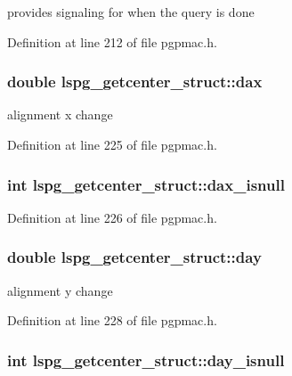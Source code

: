 provides signaling for when the query is done 



Definition at line 212 of file pgpmac.\-h.

\hypertarget{structlspg__getcenter__struct_a17db52848c28852a470222ec93ae8886}{
\subsubsection[{dax}]{\setlength{\rightskip}{0pt plus 5cm}double lspg\-\_\-getcenter\-\_\-struct\-::dax}}\label{structlspg__getcenter__struct_a17db52848c28852a470222ec93ae8886}


alignment x change 



Definition at line 225 of file pgpmac.\-h.

\hypertarget{structlspg__getcenter__struct_a621b489777d61e9db8b33b784b8d70f9}{
\subsubsection[{dax\-\_\-isnull}]{\setlength{\rightskip}{0pt plus 5cm}int lspg\-\_\-getcenter\-\_\-struct\-::dax\-\_\-isnull}}\label{structlspg__getcenter__struct_a621b489777d61e9db8b33b784b8d70f9}


Definition at line 226 of file pgpmac.\-h.

\hypertarget{structlspg__getcenter__struct_a9ce0f29540f2ff47be9788565d19f1b8}{
\subsubsection[{day}]{\setlength{\rightskip}{0pt plus 5cm}double lspg\-\_\-getcenter\-\_\-struct\-::day}}\label{structlspg__getcenter__struct_a9ce0f29540f2ff47be9788565d19f1b8}


alignment y change 



Definition at line 228 of file pgpmac.\-h.

\hypertarget{structlspg__getcenter__struct_a36f57a319288810caf365cca7827ff96}{
\subsubsection[{day\-\_\-isnull}]{\setlength{\rightskip}{0pt plus 5cm}int lspg\-\_\-getcenter\-\_\-struct\-::day\-\_\-isnull}}\label{structlspg__getcenter__struct_a36f57a319288810caf365cca7827ff96}


